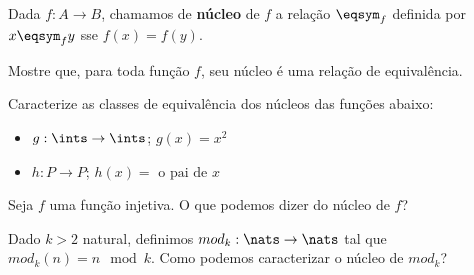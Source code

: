 \begin{definition}
Dada $f : A \to B$, chamamos de \textbf{núcleo} de $f$ a relação $\eqsym_f$ definida por $x \eqsym_f y$ sse $f(x) = f(y)$.
\end{definition}

\begin{exercise}
Mostre que, para toda função $f$, seu núcleo é uma relação de equivalência.
\end{exercise}

\begin{exercise}
Caracterize as classes de equivalência dos núcleos das funções abaixo:
    \begin{itemize}
        \item $g : \ints \to \ints$; $g(x) = x^2$
        \item $h : P \to P$; $h(x) = \text{ o pai de } x$
    \end{itemize}
\end{exercise}

\begin{exercise}
Seja $f$ uma função injetiva. O que podemos dizer do núcleo de $f$?
\end{exercise}

\begin{exercise}
Dado $k > 2$ natural, definimos $mod_k : \nats \to \nats$ tal que $mod_k(n) = n \mod k$. Como podemos caracterizar o núcleo de $mod_k$?
\end{exercise}
